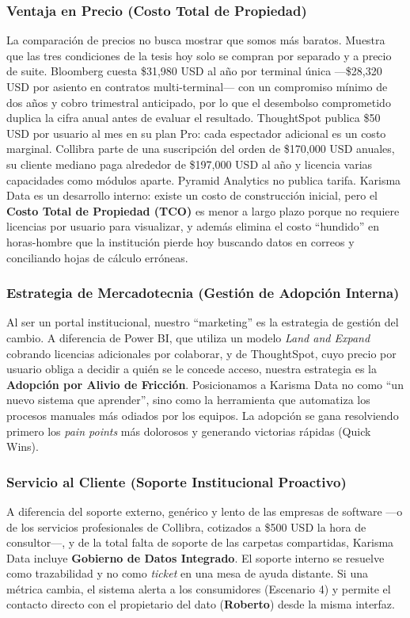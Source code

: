\subsubsection{Ventaja en Precio (Costo Total de Propiedad)}
La comparación de precios no busca mostrar que somos más baratos. Muestra que las tres condiciones de la tesis hoy solo se compran por separado y a precio de suite. Bloomberg cuesta \$31{,}980 USD al año por terminal única —\$28{,}320 USD por asiento en contratos multi-terminal— con un compromiso mínimo de dos años y cobro trimestral anticipado, por lo que el desembolso comprometido duplica la cifra anual antes de evaluar el resultado. ThoughtSpot publica \$50 USD por usuario al mes en su plan Pro: cada espectador adicional es un costo marginal. Collibra parte de una suscripción del orden de \$170{,}000 USD anuales, su cliente mediano paga alrededor de \$197{,}000 USD al año y licencia varias capacidades como módulos aparte. Pyramid Analytics no publica tarifa. Karisma Data es un desarrollo interno: existe un costo de construcción inicial, pero el \textbf{Costo Total de Propiedad (TCO)} es menor a largo plazo porque no requiere licencias por usuario para visualizar, y además elimina el costo ``hundido'' en horas-hombre que la institución pierde hoy buscando datos en correos y conciliando hojas de cálculo erróneas.

\subsubsection{Estrategia de Mercadotecnia (Gestión de Adopción Interna)}
Al ser un portal institucional, nuestro ``marketing'' es la estrategia de gestión del cambio. A diferencia de Power BI, que utiliza un modelo \textit{Land and Expand} cobrando licencias adicionales por colaborar, y de ThoughtSpot, cuyo precio por usuario obliga a decidir a quién se le concede acceso, nuestra estrategia es la \textbf{Adopción por Alivio de Fricción}. Posicionamos a Karisma Data no como ``un nuevo sistema que aprender'', sino como la herramienta que automatiza los procesos manuales más odiados por los equipos. La adopción se gana resolviendo primero los \textit{pain points} más dolorosos y generando victorias rápidas (Quick Wins).

\subsubsection{Servicio al Cliente (Soporte Institucional Proactivo)}
A diferencia del soporte externo, genérico y lento de las empresas de software —o de los servicios profesionales de Collibra, cotizados a \$500 USD la hora de consultor—, y de la total falta de soporte de las carpetas compartidas, Karisma Data incluye \textbf{Gobierno de Datos Integrado}. El soporte interno se resuelve como trazabilidad y no como \textit{ticket} en una mesa de ayuda distante. Si una métrica cambia, el sistema alerta a los consumidores (Escenario 4) y permite el contacto directo con el propietario del dato (\textbf{Roberto}) desde la misma interfaz.

